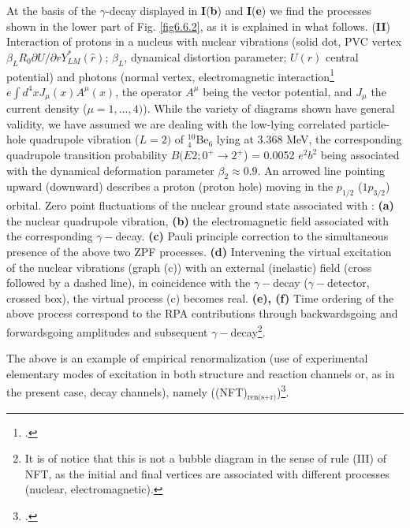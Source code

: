 At the basis of the  $\gamma$-decay displayed in \textbf{I}(\textbf{b}) and \textbf{I}(\textbf{e}) we find the processes shown in the lower part of Fig. \ref{fig6.6.2}, as it is explained in what follows. (\textbf{II}) Interaction of protons in a nucleus with nuclear vibrations (solid dot, PVC vertex 
$\beta_L R_0  \partial U/\partial r Y_{LM}^*(\hat r)$; $\beta_L$, dynamical
distortion parameter; $U(r)$ central potential) and photons (normal vertex, 
electromagnetic 
interaction\footnote{\cite{Holstein:89}.} $e \int d^4 x J_{\mu}(x) A^{\mu} (x)$, the operator $A^{\mu}$ being 
the vector potential, and $J_{\mu}$ the current density ($\mu=1,...,4)$).
While the variety of diagrams shown have general validity, we have assumed
we are dealing with the low-lying correlated particle-hole quadrupole vibration 
($L=2)$ of $^{10}_4$Be$_6$ lying at 3.368 MeV, the corresponding quadrupole transition probability $B(E2; 0^+ \to 2^+$) = 0.0052 $e^2 b^2$ being
associated with the dynamical deformation parameter $\beta_2 \approx 0.9$. An arrowed line pointing  upward (downward) 
describes a proton (proton hole) moving in the $p_{1/2}$ ($1p_{3/2}$) orbital. 
Zero point fluctuations of the nuclear ground state associated with : {\bf (a)} the nuclear
quadrupole vibration, {\bf (b)} the electromagnetic field associated with the corresponding 
$\gamma-$decay.   {\bf (c)} Pauli principle correction to the simultaneous presence 
of the above two ZPF processes. {\bf (d)} Intervening the virtual excitation of the nuclear vibrations 
(graph (c)) with an external (inelastic) field  (cross followed by a dashed line), in coincidence with the $\gamma-$decay 
($\gamma-$detector, crossed box), the virtual process (c) becomes real. {\bf (e), (f)}  Time ordering of the 
above process correspond to the  RPA contributions through backwardsgoing and forwardsgoing amplitudes
and subsequent $\gamma-$decay\footnote{It is of notice that this is not a bubble diagram in the sense of rule (III) of NFT, as the initial and final vertices are associated with different processes (nuclear, electromagnetic).}.


The above is an example of empirical renormalization (use of experimental elementary modes of excitation in both structure and  reaction channels or, as  in the present case, decay channels), namely  ((NFT)$_{\text{ren(s+r)}}$)\footnote{\cite{Broglia:16}.}.
